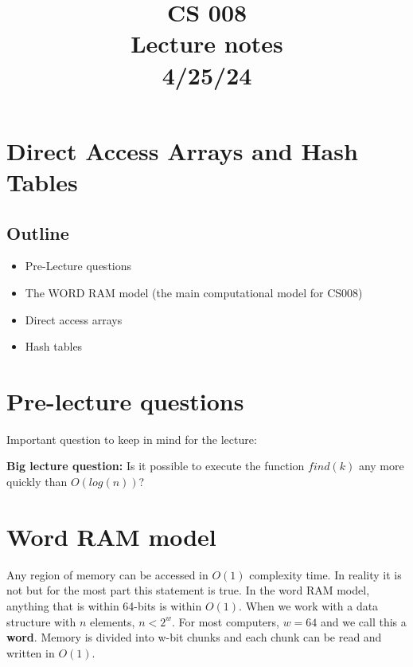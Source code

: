 \documentclass[11pt,a4paper,english]{paper}
\begin{document}
\title{CS 008 \\ Lecture notes \\ 4/25/24}
\maketitle

\section{Direct Access Arrays and Hash Tables}

\subsection{Outline}

\begin{itemize}

  \item Pre-Lecture questions
  \item The WORD RAM model (the main computational model for CS008)
  \item Direct access arrays
  \item Hash tables

\end{itemize}


\section{Pre-lecture questions}

Important question to keep in mind for the lecture:
\noindent 

\bigskip
\begin{gbox}{}{
\noindent \textbf{Big lecture question:} Is it possible to execute the function $find(k)$ any more quickly than $O(log(n))$?
}\end{gbox}

\section{Word RAM model}

Any region of memory can be accessed in $O(1)$ complexity time. In reality it is not but for the most part this statement is true. In the word RAM model, anything that is within 64-bits is within $O(1)$. When we work with a data structure with $n$ elements, $n < 2^{w}$. For most computers, $w = 64$ and we call this a \textbf{word}. Memory is divided into w-bit chunks and each chunk can be read and written in $O(1)$.
\end{document}
